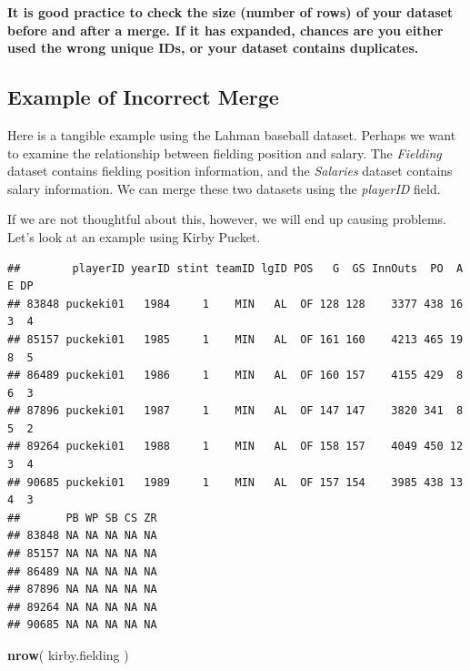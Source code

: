 \documentclass[]{book}
\newenvironment{Shaded}{\begin{snugshade}}{\end{snugshade}}
\newcommand{\KeywordTok}[1]{\textcolor[rgb]{0.13,0.29,0.53}{\textbf{#1}}}
\newcommand{\NormalTok}[1]{#1}
\newcommand{\OperatorTok}[1]{\textcolor[rgb]{0.81,0.36,0.00}{\textbf{#1}}}
\newcommand{\StringTok}[1]{\textcolor[rgb]{0.31,0.60,0.02}{#1}}
\theoremstyle{definition}
\theoremstyle{definition}
\theoremstyle{definition}
\theoremstyle{remark}
\begin{document}
\textbf{It is good practice to check the size (number of rows) of your
dataset before and after a merge. If it has expanded, chances are you
either used the wrong unique IDs, or your dataset contains duplicates.}

\hypertarget{example-of-incorrect-merge}{%
\subsection{Example of Incorrect
Merge}\label{example-of-incorrect-merge}}

Here is a tangible example using the Lahman baseball dataset. Perhaps we
want to examine the relationship between fielding position and salary.
The \emph{Fielding} dataset contains fielding position information, and
the \emph{Salaries} dataset contains salary information. We can merge
these two datasets using the \emph{playerID} field.

If we are not thoughtful about this, however, we will end up causing
problems. Let's look at an example using Kirby Pucket.

\begin{Shaded}
\end{Shaded}

\begin{verbatim}
##        playerID yearID stint teamID lgID POS   G  GS InnOuts  PO  A E DP
## 83848 puckeki01   1984     1    MIN   AL  OF 128 128    3377 438 16 3  4
## 85157 puckeki01   1985     1    MIN   AL  OF 161 160    4213 465 19 8  5
## 86489 puckeki01   1986     1    MIN   AL  OF 160 157    4155 429  8 6  3
## 87896 puckeki01   1987     1    MIN   AL  OF 147 147    3820 341  8 5  2
## 89264 puckeki01   1988     1    MIN   AL  OF 158 157    4049 450 12 3  4
## 90685 puckeki01   1989     1    MIN   AL  OF 157 154    3985 438 13 4  3
##       PB WP SB CS ZR
## 83848 NA NA NA NA NA
## 85157 NA NA NA NA NA
## 86489 NA NA NA NA NA
## 87896 NA NA NA NA NA
## 89264 NA NA NA NA NA
## 90685 NA NA NA NA NA
\end{verbatim}

\begin{Shaded}
\begin{Highlighting}[]
\KeywordTok{nrow}\NormalTok{( kirby.fielding )}
\end{Highlighting}
\end{Shaded}
\end{document}
